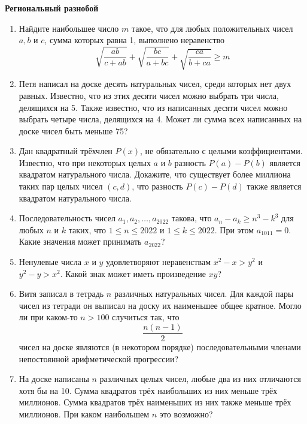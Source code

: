 \documentclass{article}
\begin{document}
\large
	
\begin{center}
	\textbf{Региональный разнобой}
\end{center}


\begin{enumerate}[label*=\protect\fbox{\arabic{enumi}}]

\item Найдите наибольшее число $m$ такое, что для любых положительных чисел $a, b$ и $c$, сумма которых равна 1, выполнено неравенство
$$\sqrt{\frac{ab}{c + ab}} + \sqrt{\frac{bc}{a + bc}} + \sqrt{\frac{ca}{b + ca}} \geqslant m$$

\item Петя написал на доске десять натуральных чисел, среди которых нет двух равных. Известно, что из этих десяти чисел можно выбрать три числа, делящихся на 5. Также известно, что из написанных десяти чисел можно выбрать четыре числа, делящихся на 4. Может ли сумма всех написанных на доске чисел быть меньше 75?

\item  Дан квадратный трёхчлен $P(x)$, не обязательно с целыми коэффициентами. Известно, что при некоторых целых $a$ и $b$ разность $P(a) - P(b)$ является квадратом натурального числа. Докажите, что существует более миллиона таких пар целых чисел $(c, d)$, что разность $P(c) - P(d)$ также является квадратом натурального числа.

\item Последовательность чисел $a_1, a_2, \dotsc , a_{2022}$ такова, что $a_n - a_k \geqslant n^3 - k^3$ для любых $n$ и $k$ таких, что $1 \leqslant n \leqslant 2022$ и $1 \leqslant k \leqslant 2022$. При этом $a_{1011} = 0$. Какие значения может принимать $a_{2022}$? 

\item  Ненулевые числа $x$ и $y$ удовлетворяют неравенствам $x^2 - x > y^2$ и $y^2 - y > x^2$. Какой знак может иметь произведение $xy$?

\item Витя записал в тетрадь $n$ различных натуральных чисел. Для каждой пары чисел из тетради он выписал на доску их наименьшее общее кратное. Могло ли при каком-то $n > 100$ случиться так, что $$\frac{n(n - 1)}{2}$$ чисел на доске являются (в некотором порядке) последовательными членами непостоянной арифметической прогрессии? 

\item На доске написаны $n$ различных целых чисел, любые два из них отличаются хотя бы на 10. Сумма квадратов трёх наибольших из них меньше трёх миллионов. Сумма квадратов трёх наименьших из них также меньше трёх миллионов. При каком наибольшем $n$ это возможно?


\end{enumerate}
\end{document}
